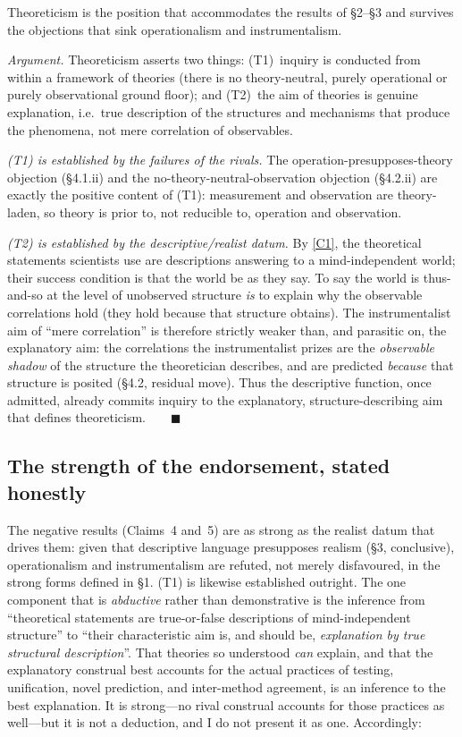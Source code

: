 \documentclass[12pt]{article}
\begin{document}
\begin{description}[leftmargin=1.6em,style=nextline]
\item[Claim 6.] Theoreticism is the position that accommodates the
results of \S2--\S3 and survives the objections that sink operationalism
and instrumentalism.
\end{description}

\noindent\emph{Argument.} Theoreticism asserts two things: (T1)~inquiry is
conducted from within a framework of theories (there is no
theory-neutral, purely operational or purely observational ground floor);
and (T2)~the aim of theories is genuine explanation, i.e.\ true
description of the structures and mechanisms that produce the phenomena,
not mere correlation of observables.

\emph{(T1) is established by the failures of the rivals.} The
operation-presupposes-theory objection (\S4.1.ii) and the
no-theory-neutral-observation objection (\S4.2.ii) are exactly the
positive content of (T1): measurement and observation are theory-laden,
so theory is prior to, not reducible to, operation and observation.

\emph{(T2) is established by the descriptive/realist datum.} By \ref{C1},
the theoretical statements scientists use are descriptions answering to a
mind-independent world; their success condition is that the world be as
they say. To say the world is thus-and-so at the level of unobserved
structure \emph{is} to explain why the observable correlations hold
(they hold because that structure obtains). The instrumentalist aim of
``mere correlation'' is therefore strictly weaker than, and parasitic on,
the explanatory aim: the correlations the instrumentalist prizes are the
\emph{observable shadow} of the structure the theoretician describes, and
are predicted \emph{because} that structure is posited (\S4.2, residual
move). Thus the descriptive function, once admitted, already commits
inquiry to the explanatory, structure-describing aim that defines
theoreticism.$\qquad\blacksquare$

\subsection{The strength of the endorsement, stated honestly}

The negative results (Claims~4 and~5) are as strong as the realist datum
that drives them: given that descriptive language presupposes realism
(\S3, conclusive), operationalism and instrumentalism are refuted, not
merely disfavoured, in the strong forms defined in \S1. (T1) is likewise
established outright. The one component that is \emph{abductive} rather
than demonstrative is the inference from ``theoretical statements are
true-or-false descriptions of mind-independent structure'' to ``their
characteristic aim is, and should be, \emph{explanation by true
structural description}''. That theories so understood \emph{can}
explain, and that the explanatory construal best accounts for the actual
practices of testing, unification, novel prediction, and inter-method
agreement, is an inference to the best explanation. It is strong---no
rival construal accounts for those practices as well---but it is not a
deduction, and I do not present it as one. Accordingly:
\end{document}
